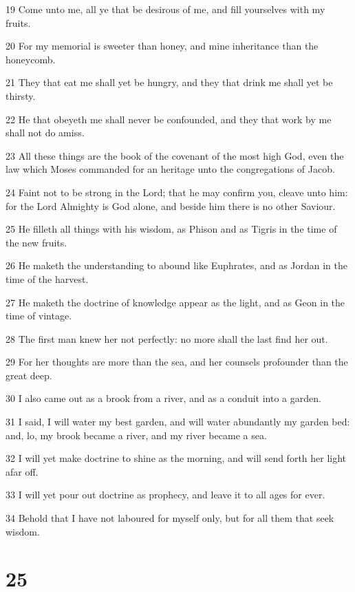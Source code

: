 \par 19 Come unto me, all ye that be desirous of me, and fill yourselves with my fruits.
\par 20 For my memorial is sweeter than honey, and mine inheritance than the honeycomb.
\par 21 They that eat me shall yet be hungry, and they that drink me shall yet be thirsty.
\par 22 He that obeyeth me shall never be confounded, and they that work by me shall not do amiss.
\par 23 All these things are the book of the covenant of the most high God, even the law which Moses commanded for an heritage unto the congregations of Jacob.
\par 24 Faint not to be strong in the Lord; that he may confirm you, cleave unto him: for the Lord Almighty is God alone, and beside him there is no other Saviour.
\par 25 He filleth all things with his wisdom, as Phison and as Tigris in the time of the new fruits.
\par 26 He maketh the understanding to abound like Euphrates, and as Jordan in the time of the harvest.
\par 27 He maketh the doctrine of knowledge appear as the light, and as Geon in the time of vintage.
\par 28 The first man knew her not perfectly: no more shall the last find her out.
\par 29 For her thoughts are more than the sea, and her counsels profounder than the great deep.
\par 30 I also came out as a brook from a river, and as a conduit into a garden.
\par 31 I said, I will water my best garden, and will water abundantly my garden bed: and, lo, my brook became a river, and my river became a sea.
\par 32 I will yet make doctrine to shine as the morning, and will send forth her light afar off.
\par 33 I will yet pour out doctrine as prophecy, and leave it to all ages for ever.
\par 34 Behold that I have not laboured for myself only, but for all them that seek wisdom.

\chapter{25}

